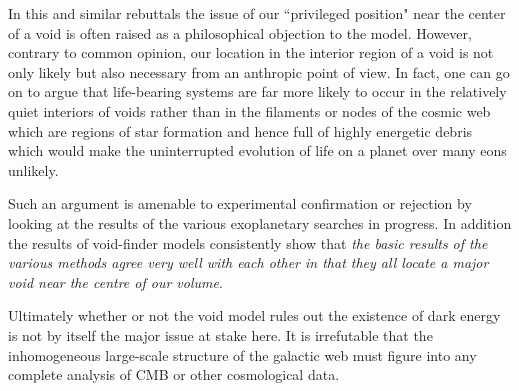 In this and similar rebuttals the issue of our ``privileged position" near the center of a void is often raised as a philosophical objection to the model. However, contrary to common opinion, our location in the interior region of a void is not only likely but also necessary from an anthropic point of view. In fact, one can go on to argue that life-bearing systems are far more likely to occur in the relatively quiet interiors of voids rather than in the filaments or nodes of the cosmic web which are regions of star formation and hence full of highly energetic debris which would make the uninterrupted evolution of life on a planet over many eons unlikely.

Such an argument is amenable to experimental confirmation or rejection by looking at the results of the various exoplanetary searches in progress. In addition the results of void-finder models \cite{Colberg2008The-Aspen-Amsterdam} consistently show that \emph{the basic results of the various methods agree very well with each other in that they all locate a major void near the centre of our volume}.

Ultimately whether or not the void model rules out the existence of dark energy is not by itself the major issue at stake here. It is irrefutable that the inhomogeneous large-scale structure of the galactic web must figure into any complete analysis of CMB or other cosmological data.

